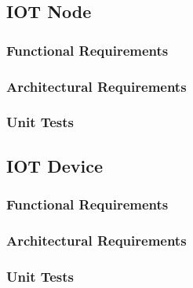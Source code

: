 \documentclass[pdftex,10pt,a4paper]{report}
\begin{document}
			\subsection{IOT Node}
				\subsubsection{Functional Requirements}
				\subsubsection{Architectural Requirements}
				\subsubsection{Unit Tests}
			\subsection{IOT Device}
				\subsubsection{Functional Requirements}
				\subsubsection{Architectural Requirements}
				\subsubsection{Unit Tests}
				
\endgroup
	
\end{document}
